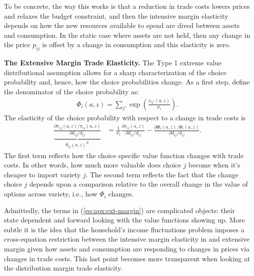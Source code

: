 \documentclass[12pt,pdftex]{article}
\begin{document}
\begin{onehalfspacing}
To be concrete, the way this works is that a reduction in trade costs lowers prices and relaxes the budget constraint, and then the intensive margin elasticity depends on how the new resources available to spend are dived between assets and consumption. In the static case where assets are not held, then any change in the price $p_{ij}$ is offset by a change in consumption and this elasticity is zero.

\textbf{The Extensive Margin Trade Elasticity.} The Type 1 extreme value distributional assumption allows for a sharp characterization of the choice probability and, hence, how the choice probabilities change. As a first step, define the denominator of the choice probability as:
\begin{align}
\Phi_{i}(a,z) = \sum_{j'} \exp \left( \frac{ v_{ij'}(a, z) }{\sigma_{\epsilon}} \right).
\end{align}
The elasticity of the choice probability with respect to a change in trade costs is
\begin{align}
\underbrace{ \frac{\partial \pi_{ij}(a,z) / \pi_{ij}(a,z)}{\partial d_{ij} / d_{ij}} }_{\theta_{ij}(a,z)^{E}} &= \frac{1}{\sigma_{\epsilon}}\frac{\partial v_{ij}(a,z)}{\partial d_{ij}/d_{ij}} -  \frac{\partial \Phi_{i}(a,z) / \Phi_{i}(a,z)}{\partial d_{ij}/d_{ij}}.
\label{eq:apx:ext-margin}
\end{align}
The first term reflects how the choice specific value function changes with trade costs. In other words, how much more valuable does choice $j$ become when it's cheaper to import variety $j$. The second term reflects the fact that the change choice $j$ depends upon a comparison relative to the overall change in the value of options across variety, i.e., how $\Phi_{i}$ changes.

Admittedly, the terms in (\ref{eq:apx:ext-margin}) are complicated objects: their state dependent and forward looking with the value functions showing up. More subtle it is the idea that the household's income fluctuations problem imposes a cross-equation restriction between the intensive margin elasticity in and extensive margin given how assets and consumption are responding to changes in prices via changes in trade costs. This last point becomes more transparent when looking at the distribution margin trade elasticity.


\end{onehalfspacing}
\end{document}
